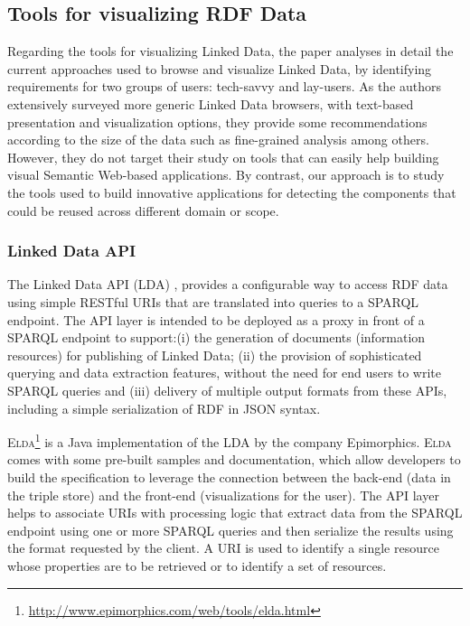 \subsection{Tools for visualizing RDF Data}
\label{sec:vizrdf}
Regarding the tools for visualizing Linked Data,  the paper \cite{aba2011} analyses in detail the current approaches used to browse and visualize Linked Data, by identifying requirements for two groups of users: tech-savvy and lay-users. As the authors extensively surveyed more generic Linked Data browsers, with text-based presentation and visualization options, they provide some recommendations according to the size of the data such as fine-grained analysis among others. However, they do not target their study on tools that can easily help building visual Semantic Web-based applications. By contrast, our approach is to study the tools used to build innovative applications for detecting the components that could be reused across different domain or scope.

\subsubsection{Linked Data API}
The Linked Data API (LDA) \cite{ldapi}, provides a configurable way to access RDF data using simple RESTful URIs that are translated into queries to a SPARQL endpoint. The API layer is intended to be deployed as a proxy in front of a SPARQL endpoint to support:(i) the generation of documents (information resources) for publishing of Linked Data; (ii) the provision of sophisticated querying and data extraction features, without the need for end users to write SPARQL queries and (iii) delivery of multiple output formats from these APIs, including a simple serialization of RDF in JSON syntax.

\textsc{Elda}\footnote{\url{http://www.epimorphics.com/web/tools/elda.html}} is a Java implementation of the LDA by the company Epimorphics. \textsc{Elda} comes with some pre-built samples and documentation, which allow developers to build the specification to leverage the connection between the back-end (data in the triple store) and the front-end (visualizations for the user). The API layer helps to associate URIs with processing logic that extract data from the SPARQL endpoint using one or more SPARQL queries and then serialize the results using the format requested by the client. A URI is used to identify a single resource whose properties are to be retrieved or to identify a set of resources.

